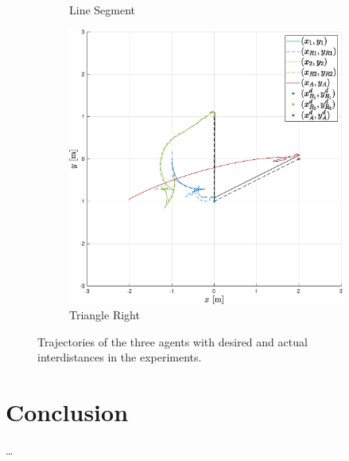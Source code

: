 \documentclass{ifacconf}
\begin{document}
\begin{figure}
\begin{subfigure}[b]{0.31\columnwidth}
      \caption{Line Segment}
   \end{subfigure}
    \begin{subfigure}[b]{0.31\columnwidth}
        \centering
        \includegraphics[width=\linewidth]{images/experiment/nominal/3rd_scenario_exp.eps}
        \caption{Triangle Right}
      \end{subfigure}
   \vspace{-0.2cm}
   \caption{Trajectories of the three agents with desired and actual interdistances in the experiments.}
\end{figure}


\section{Conclusion}
\label{sec:conclusion}

\dots

\end{document}
